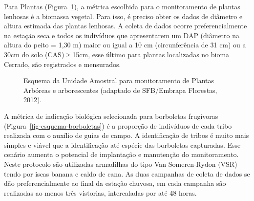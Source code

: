 \documentclass[
  letterpaper,
]{scrbook}
\begin{document}
Para Plantas (Figura~\ref{fig-esquema-unidade-amostral}), a métrica
escolhida para o monitoramento de plantas lenhosas é a biomassa vegetal.
Para isso, é preciso obter os dados de diâmetro e altura estimada das
plantas lenhosas. A coleta de dados ocorre preferencialmente na estação
seca e todos os indivíduos que apresentarem um DAP (diâmetro na altura
do peito = 1,30 m) maior ou igual a 10 cm (circunferência de 31 cm) ou a
30cm do solo (CAS) ≥ 15cm, esse último para plantas localizadas no bioma
Cerrado, são registrados e mensurados.

\begin{figure}[H]


\caption{\label{fig-esquema-unidade-amostral}Esquema da Unidade Amostral
para monitoramento de Plantas Arbóreas e arborescentes (adaptado de
SFB/Embrapa Florestas, 2012).}

\end{figure}%

A métrica de indicação biológica selecionada para borboletas frugívoras
(Figura~\ref{fig-esquema-borboletas}) é a proporção de indivíduos de
cada tribo realizada com o auxílio de guias de campo. A identificação de
tribos é muito mais simples e viável que a identificação até espécie das
borboletas capturadas. Esse cenário aumenta o potencial de implantação e
manutenção do monitoramento. Neste protocolo são utilizadas armadilhas
do tipo Van Someren-Rydon (VSR) tendo por iscas banana e caldo de cana.
As duas campanhas de coleta de dados se dão preferencialmente ao final
da estação chuvosa, em cada campanha são realizadas ao menos três
vistorias, intercaladas por até 48 horas.
\end{document}

